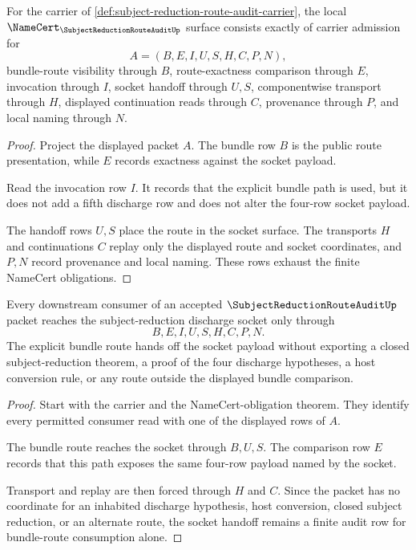 \begin{theorem}
\label{thm:subject-reduction-route-audit-namecert-obligations}
For the carrier of \autoref{def:subject-reduction-route-audit-carrier}, the
local $\NameCert_{\SubjectReductionRouteAuditUp}$ surface consists exactly of
carrier admission for
$$
A=(B,E,I,U,S,H,C,P,N),
$$
bundle-route visibility through $B$, route-exactness comparison through $E$,
invocation through $I$, socket handoff through $U,S$, componentwise transport
through $H$, displayed continuation reads through $C$, provenance through $P$,
and local naming through $N$.
\end{theorem}
\begin{proof}
Project the displayed packet $A$. The bundle row $B$ is the public route
presentation, while $E$ records exactness against the socket payload.

Read the invocation row $I$. It records that the explicit bundle path is used,
but it does not add a fifth discharge row and does not alter the four-row
socket payload.

The handoff rows $U,S$ place the route in the socket surface. The transports
$H$ and continuations $C$ replay only the displayed route and socket
coordinates, and $P,N$ record provenance and local naming. These rows exhaust
the finite NameCert obligations.
\end{proof}

\begin{theorem}
\label{thm:subject-reduction-route-audit-socket-handoff}
Every downstream consumer of an accepted $\SubjectReductionRouteAuditUp$
packet reaches the subject-reduction discharge socket only through
$$
B,E,I,U,S,H,C,P,N.
$$
The explicit bundle route hands off the socket payload without exporting a
closed subject-reduction theorem, a proof of the four discharge hypotheses, a
host conversion rule, or any route outside the displayed bundle comparison.
\end{theorem}
\begin{proof}
Start with the carrier and the NameCert-obligation theorem. They identify
every permitted consumer read with one of the displayed rows of $A$.

The bundle route reaches the socket through $B,U,S$. The comparison row $E$
records that this path exposes the same four-row payload named by the socket.

Transport and replay are then forced through $H$ and $C$. Since the packet has
no coordinate for an inhabited discharge hypothesis, host conversion, closed
subject reduction, or an alternate route, the socket handoff remains a finite
audit row for bundle-route consumption alone.
\end{proof}

